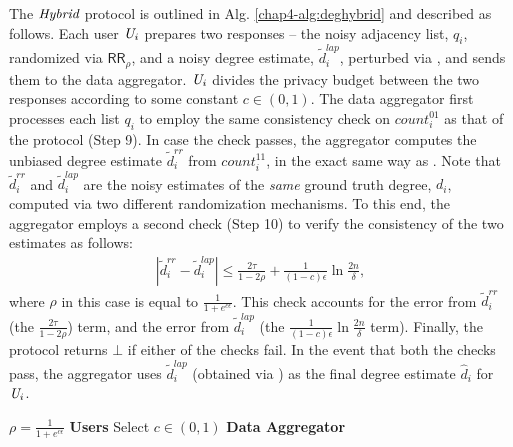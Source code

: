 The $\textit{Hybrid}$ protocol is outlined in Alg. \ref{chap4-alg:deghybrid} and described as follows. Each user $\textit{U}_i$ prepares two responses -- the noisy adjacency list, $q_i$, randomized via $\textsf{RR}_{\rho}$, and a noisy degree estimate, $\tilde{d}^{lap}_i$, perturbed via \RLap, and sends them to the data aggregator. $\textit{U}_i$ divides the privacy budget between the two responses according to some constant $c \in (0,1)$. The data aggregator first processes each list $q_i$ to employ the same consistency check on $count^{01}_i$ as that of the \DegRRCheck{} protocol (Step 9).
In case the check passes, the aggregator computes the unbiased degree estimate $\tilde{d}^{rr}_i$ from $count_i^{11}$, in the exact same way as \DegRRCheck. Note that $\tilde{d}^{rr}_i$ and $\tilde{d}^{lap}_i$ are the noisy estimates of the \textit{same} ground truth degree, $d_i$, computed via two different randomization mechanisms. To this end, the aggregator employs a second check (Step 10) to verify the consistency of the two estimates as follows:
\begin{gather*} |\tilde{d}_i^{rr} - \tilde{d}_i^{lap}| \leq \frac{2\tau}{1-2\rho} + \frac{1}{(1-c)\epsilon}\ln \tfrac{2n}{\delta} ,\end{gather*} 
where $\rho$ in this case is equal to $\frac{1}{1+e^{c\epsilon}}$.
This check accounts for the error from $\tilde{d}^{rr}_i$ (the $\frac{2\tau}{1-2\rho}$) term, and the error from $\tilde{d}^{lap}_i$ (the $\frac{1}{(1-c)\epsilon}\ln \tfrac{2n}{\delta}$ term).
Finally, the protocol returns $\bot$ if either of the checks fail.
In the event that both the checks pass, the aggregator uses $\tilde{d}_i^{lap}$ (obtained via \RLap) as the final degree estimate $\hat{d}_i$ for $\textit{U}_i$.

\begin{algorithm}[t]
%  
  $\rho=\frac{1}{1+e^{c\epsilon}}$\;
  \textbf{Users}\;
  Select $c\in (0,1)$\;
  \textbf{Data Aggregator}\;
  \caption{\DegHybrid: $\{0,1\}^{n\times n}\mapsto \{\mathbb{N}\cup \{\bot\}\}^n$}\label{chap4-alg:deghybrid}
\end{algorithm}

